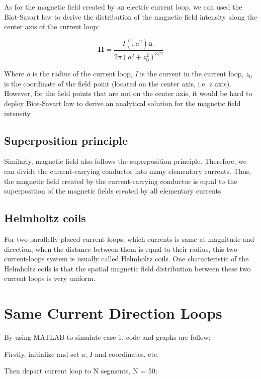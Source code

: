 \documentclass[10pt, journal, final]{IEEEtran}
\begin{document}
As for the magnetic field created by an electric current loop, we can used the Biot-Savart law to derive
the distribution of the magnetic field intensity along the center axis of the current loop:

\begin{equation}
    \mathbf{H} = \frac{I(\pi a^2)\mathbf{a}_z}{2\pi (a^2+z_0^2)^{3/2}}
\end{equation}

Where \emph{a} is the radius of the current loop, \emph{I} is the current in the current loop, $z_0$ is the coordinate
of the field point (located on the center axis, i.e. z axis). However, for the field points that are not on the center
axis, it would be hard to deploy Biot-Savart law to derive an analytical solution for the magnetic field intensity.\par

\subsection{
    Superposition principle
}
\label{subsec: Superposition}
Similarly, magnetic field also follows the superposition principle. Therefore, we can divide the current-carrying
conductor into many elementary currents. Thus, the magnetic field created by the current-carrying conductor is equal
to the superposition of the magnetic fields created by all elementary currents.

\subsection{
    Helmholtz coils
}
\label{subsec: Helmholtz}
For two parallelly placed current loops, which currents is same at magnitude and direction,
when the distance between them is equal to their radius, this two-current-loops system is usually called Helmholtz coils.
One characteristic of the Helmholtz coils is that
the spatial magnetic field distribution between these two current loops is very uniform.

\section{
  Same Current Direction Loops
 }
\label{sec: Same Direction}

By using MATLAB to simulate case 1, code and graphs are follow:\par

Firstly, initialize and set $a$, $I$ and coordinates, etc.

Then depart current loop to N segments, N = 50;

\end{document}
